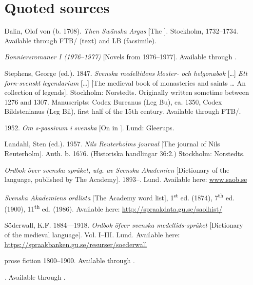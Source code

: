 \documentclass[output=paper]{langscibook}
\begin{document}
\section*{Quoted sources}
\begin{description}\sloppy
\item[\textit{Argus}:] Dalin, Olof von (b. 1708). \textit{Then Swänska Argus} [The  ]. Stockholm, 1732–1734. Available through FTB/ (text) and LB (facsimile).
\item[Bonniers:] \textit{Bonniersromaner I (1976–1977)} [Novels from 1976–1977]. Available through .
\item[Leg:] Stephens, George (ed.). 1847. \textit{Svenska medeltidens kloster- och helgonabok} […] \textit{Ett forn-svenskt legendarium} […] [The  medieval book of monasteries and saints … An  collection of legends]. Stockholm: Norstedts. Originally written sometime between 1276 and 1307. Manuscripts: Codex Bureanus (Leg Bu), ca. 1350, Codex Bildstenianus (Leg Bil), first half of the 15th century. Available through FTB/.
\item[\normalfont Holm, Gösta.] 1952. \textit{Om s-passivum i svenska} [On  in ]. Lund: Gleerups.
\item[Reuterholm:] Landahl, Sten (ed.). 1957. \textit{Nils Reuterholms journal} [The journal of Nils Reuterholm]. Auth. b. 1676. (Historiska handlingar 36:2.) Stockholm: Norstedts.
\item[\isi{SAOB}:] \textit{Ordbok över svenska språket, utg. av Svenska Akademien} [Dictionary of the  language, published by The  Academy]. 1893–. Lund. Available here: \href{http://www.saob.se}{{www.saob.se}} 
\item[\isi{SAOL}:] \textit{Svenska Akademiens ordlista} [The  Academy word list], 1\textsuperscript{st} ed. (1874), 7\textsuperscript{th} ed. (1900), 11\textsuperscript{th} ed. (1986). Available here: \url{http://spraakdata.gu.se/saolhist/}
\item[Sdw:] Söderwall, K.F. 1884—1918. \textit{Ordbok öfver svenska medeltids-språket} [Dictionary of the  medieval language]. Vol. I–III. Lund. Available here: \url{https://spraakbanken.gu.se/resurser/soederwall} 
\item[SPF:]  prose fiction 1800–1900. Available through . 
\item[\textit{Äldre svenska romaner}] [Older \ili{Swedish} novels]. Available through . 
\end{description}
\end{document}
